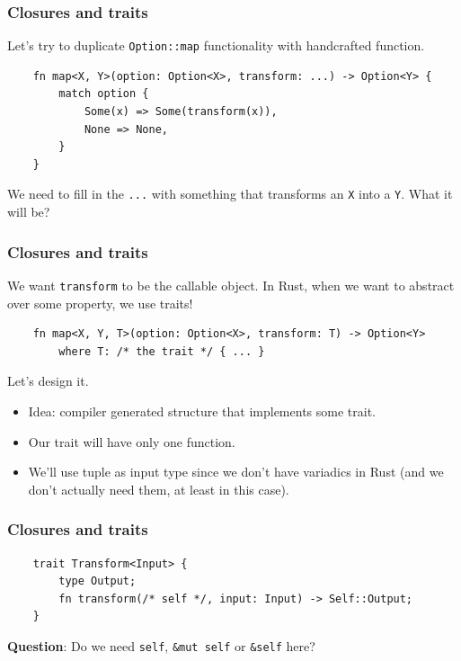 \documentclass[aspectratio=1610,t]{beamer}
\begin{document}
\begin{frame}[fragile]
\frametitle{Closures and traits}
Let's try to duplicate \texttt{Option::map} functionality with handcrafted function.

\begin{verbatim}
    fn map<X, Y>(option: Option<X>, transform: ...) -> Option<Y> {
        match option {
            Some(x) => Some(transform(x)),
            None => None,
        }
    }
\end{verbatim}

We need to fill in the \texttt{...} with something that transforms an \texttt{X} into a \texttt{Y}. What it will be?
\end{frame}


\begin{frame}[fragile]
\frametitle{Closures and traits}
We want \texttt{transform} to be the callable object. In Rust, when we want to abstract over some property, we use traits!

\begin{verbatim}
    fn map<X, Y, T>(option: Option<X>, transform: T) -> Option<Y>
        where T: /* the trait */ { ... }
\end{verbatim}

Let's design it.

\begin{itemize}
    \item<2-> Idea: compiler generated structure that implements some trait.
    \item<3-> Our trait will have only one function.
    \item<4-> We'll use tuple as input type since we don't have variadics in Rust (and we don't actually need them, at least in this case).
\end{itemize}
\end{frame}


\begin{frame}[fragile]
\frametitle{Closures and traits}
\begin{verbatim}
    trait Transform<Input> {
        type Output;
        fn transform(/* self */, input: Input) -> Self::Output;
    }
\end{verbatim}

\textbf{Question}: Do we need \texttt{self}, \texttt{\&mut self} or \texttt{\&self} here?

\end{frame}
\end{document}
